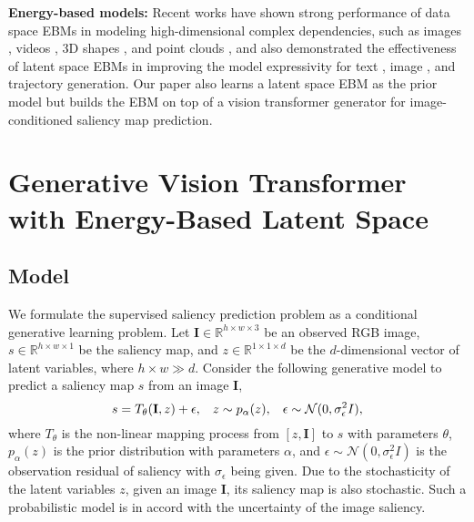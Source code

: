 \documentclass{article}
\begin{document}
\noindent\textbf{Energy-based models:} Recent works have shown strong performance of data space EBMs \cite{xie2016theory,nijkamp2019learning} in modeling high-dimensional complex dependencies, such as images \cite{ZhengXL21,ZhaoXL21,GaoLZZW18,DuM19,GaoSPWK21}, videos \cite{XieZW17,XieZW21}, 3D shapes \cite{XieZGWZW18,xie2020generative}, and point clouds \cite{XieXZZW21}, and also demonstrated the effectiveness of latent space EBMs \cite{ebm_prior} in improving the model expressivity for text \cite{PangW21}, image \cite{ebm_prior}, and trajectory \cite{PangZ0W21} generation. Our paper also learns a latent space EBM as the prior model but builds the EBM on top of a vision transformer generator for image-conditioned saliency map prediction.




\section{Generative Vision Transformer with Energy-Based Latent Space}


\subsection{Model}


We formulate the supervised saliency prediction problem as a conditional generative learning problem. Let $\textbf{I} \in \mathbb{R}^{h \times w \times 3}$ be an observed RGB image, $s \in \mathbb{R}^{h \times w \times 1}$ be the saliency map, and $z \in \mathbb{R}^{1 \times 1 \times d}$ be the $d$-dimensional vector of latent variables, where $h \times w  \gg d$. Consider the following generative model to predict a saliency map $s$ from an image $\textbf{I}$,
\begin{equation}
     s=T_{\theta}(\textbf{I}, z)+ \epsilon, \hspace{3mm} z \sim p_\alpha(z), \hspace{3mm} \epsilon \sim \mathcal{N}(0,\sigma_\epsilon^2 I),   \label{eq:G_Transformer}
\end{equation}
where $T_\theta$ is the non-linear mapping process from $[z,\textbf{I}]$ to $s$ with parameters $\theta$, $p_\alpha(z)$ is the prior distribution with parameters $\alpha$, and $\epsilon \sim \mathcal{N}(0,\sigma_\epsilon^2 I)$ is the observation residual of saliency with $\sigma_\epsilon$ being given. Due to the stochasticity of the latent variables $z$, given an image $\textbf{I}$, its saliency map is also stochastic. Such a probabilistic model is in accord with the uncertainty of the image saliency.  
\end{document}
